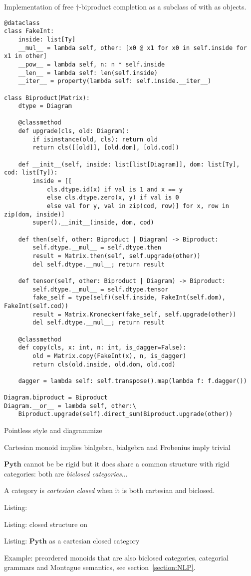 \begin{python}
{\normalfont Implementation of free $\dagger$-biproduct completion as a subclass of  with  as objects.}

\begin{verbatim}
@dataclass
class FakeInt:
    inside: list[Ty]
    __mul__ = lambda self, other: [x0 @ x1 for x0 in self.inside for x1 in other]
    __pow__ = lambda self, n: n * self.inside
    __len__ = lambda self: len(self.inside)
    __iter__ = property(lambda self: self.inside.__iter__)

class Biproduct(Matrix):
    dtype = Diagram

    @classmethod
    def upgrade(cls, old: Diagram):
        if isinstance(old, cls): return old
        return cls([[old]], [old.dom], [old.cod])

    def __init__(self, inside: list[list[Diagram]], dom: list[Ty], cod: list[Ty]):
        inside = [[
            cls.dtype.id(x) if val is 1 and x == y
            else cls.dtype.zero(x, y) if val is 0
            else val for y, val in zip(cod, row)] for x, row in zip(dom, inside)]
        super().__init__(inside, dom, cod)

    def then(self, other: Biproduct | Diagram) -> Biproduct:
        self.dtype.__mul__ = self.dtype.then
        result = Matrix.then(self, self.upgrade(other))
        del self.dtype.__mul__; return result

    def tensor(self, other: Biproduct | Diagram) -> Biproduct:
        self.dtype.__mul__ = self.dtype.tensor
        fake_self = type(self)(self.inside, FakeInt(self.dom), FakeInt(self.cod))
        result = Matrix.Kronecker(fake_self, self.upgrade(other))
        del self.dtype.__mul__; return result

    @classmethod
    def copy(cls, x: int, n: int, is_dagger=False):
        old = Matrix.copy(FakeInt(x), n, is_dagger)
        return cls(old.inside, old.dom, old.cod)

    dagger = lambda self: self.transpose().map(lambda f: f.dagger())

Diagram.biproduct = Biproduct
Diagram.__or__ = lambda self, other:\
    Biproduct.upgrade(self).direct_sum(Biproduct.upgrade(other))
\end{verbatim}
\end{python}


Pointless style and diagrammize


Cartesian monoid implies bialgebra, bialgebra and Frobenius imply trivial

$\mathbf{Pyth}$ cannot be be rigid but it does share a common structure with rigid categories: both are \emph{biclosed categories}...

A category is \emph{cartesian closed} when it is both cartesian and biclosed.

Listing: 

Listing: closed structure on 

Listing: $\mathbf{Pyth}$ as a cartesian closed category

Example: preordered monoids that are also biclosed categories, categorial grammars and Montague semantics, see section~\ref{section:NLP}.
